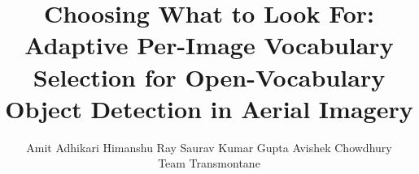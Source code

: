 \documentclass[10pt,twocolumn,letterpaper]{article}
\title{Choosing What to Look For: Adaptive Per-Image Vocabulary Selection for Open-Vocabulary Object Detection in Aerial Imagery}
\author{Amit Adhikari \qquad Himanshu Ray \qquad Saurav Kumar Gupta \qquad Avishek Chowdhury\\
Team Transmontane
}
\begin{document}
\maketitle








{
    \small
    
    
}
\end{document}
